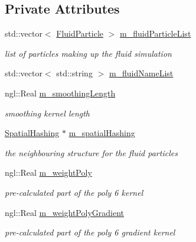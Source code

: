 \subsection*{Private Attributes}
\begin{DoxyCompactItemize}
\item 
std::vector$<$ \hyperlink{class_fluid_particle}{FluidParticle} $>$ \hyperlink{class_s_p_h_solver_ae158d26d2bb95bdc260e289e6b8c3b0a}{m\_\-fluidParticleList}
\begin{DoxyCompactList}\small\item\em list of particles making up the fluid simulation \item\end{DoxyCompactList}\item 
std::vector$<$ std::string $>$ \hyperlink{class_s_p_h_solver_a7eacf79d8d39f885736c50ac8dd81aa2}{m\_\-fluidNameList}
\item 
ngl::Real \hyperlink{class_s_p_h_solver_a09a49a1460b8d9d311c177bb61d614fc}{m\_\-smoothingLength}
\begin{DoxyCompactList}\small\item\em smoothing kernel length \item\end{DoxyCompactList}\item 
\hyperlink{class_spatial_hashing}{SpatialHashing} $\ast$ \hyperlink{class_s_p_h_solver_a1743796456c478d5e444d83384bef1dd}{m\_\-spatialHashing}
\begin{DoxyCompactList}\small\item\em the neighbouring structure for the fluid particles \item\end{DoxyCompactList}\item 
ngl::Real \hyperlink{class_s_p_h_solver_ad5a368aa4d10c71bb1aafe84c9f9f838}{m\_\-weightPoly}
\begin{DoxyCompactList}\small\item\em pre-\/calculated part of the poly 6 kernel \item\end{DoxyCompactList}\item 
ngl::Real \hyperlink{class_s_p_h_solver_a90434405f6296766d54626fe0582d664}{m\_\-weightPolyGradient}
\begin{DoxyCompactList}\small\item\em pre-\/calculated part of the poly 6 gradient kernel \item\end{DoxyCompactList}\item 

\end{DoxyCompactItemize}
